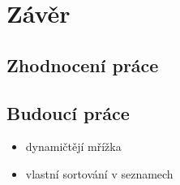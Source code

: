 

\chapter{Závěr}


\section{Zhodnocení práce}


\section{Budoucí práce}


\begin{itemize}
	\item dynamičtějí mřížka
	\item vlastní sortování v seznamech

\end{itemize}